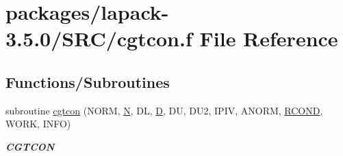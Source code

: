 \hypertarget{cgtcon_8f}{}\section{packages/lapack-\/3.5.0/\+S\+R\+C/cgtcon.f File Reference}
\label{cgtcon_8f}
\subsection*{Functions/\+Subroutines}
\begin{DoxyCompactItemize}
\item 
subroutine \hyperlink{group__complexGTcomputational_ga8f80227b32b600dc75a5e982005ec1c2}{cgtcon} (N\+O\+R\+M, \hyperlink{polmisc_8c_a0240ac851181b84ac374872dc5434ee4}{N}, D\+L, \hyperlink{odrpack_8h_a7dae6ea403d00f3687f24a874e67d139}{D}, D\+U, D\+U2, I\+P\+I\+V, A\+N\+O\+R\+M, \hyperlink{superlu__enum__consts_8h_af00a42ecad444bbda75cde1b64bd7e72a9b5c151728d8512307565994c89919d5}{R\+C\+O\+N\+D}, W\+O\+R\+K, I\+N\+F\+O)
\begin{DoxyCompactList}\small\item\em {\bfseries C\+G\+T\+C\+O\+N} \end{DoxyCompactList}\end{DoxyCompactItemize}
